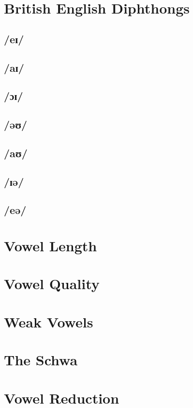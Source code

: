 \section{British English Diphthongs}
\subsection{/eɪ/}
\subsection{/aɪ/}
\subsection{/ɔɪ/}
\subsection{/əʊ/}
\subsection{/aʊ/}
\subsection{/ɪə/}
\subsection{/eə/}

\section{Vowel Length}
\section{Vowel Quality}
\section{Weak Vowels}
\section{The Schwa}
\section{Vowel Reduction}
